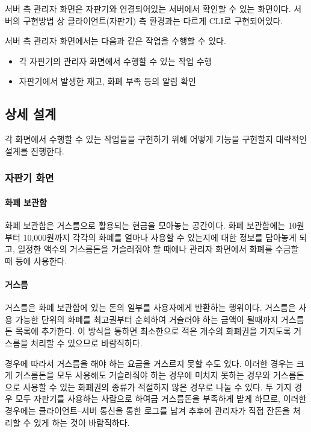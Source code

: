 \documentclass{oblivoir}
\begin{document}
    서버 측 관리자 화면은 자판기와 연결되어있는
    서버에서 확인할 수 있는 화면이다.
    서버의 구현방법 상 클라이언트(자판기) 측 환경과는 다르게
    CLI로 구현되어있다.

    서버 측 관리자 화면에서는 다음과 같은 작업을 수행할 수 있다.
    \begin{itemize}
        \item 각 자판기의 관리자 화면에서 수행할 수 있는 작업 수행
        \item 자판기에서 발생한 재고, 화폐 부족 등의 알림 확인
    \end{itemize}

    \subsection{상세 설계}

    각 화면에서 수행할 수 있는 작업들을 구현하기 위해
    어떻게 기능을 구현할지 대략적인 설계를 진행한다.

    \subsubsection{자판기 화면}

    \paragraph{화폐 보관함}

    화폐 보관함은 거스름으로 활용되는 현금을 모아놓는 공간이다.
    화폐 보관함에는 10원부터 10,000원까지 각각의 화폐를
    얼마나 사용할 수 있는지에 대한 정보를 담아놓게 되고,
    일정한 액수의 거스름돈을 거슬러줘야 할 때에나
    관리자 화면에서 화폐를 수금할 때 등에 사용한다.

    \paragraph{거스름}

    거스름은 화폐 보관함에 있는 돈의 일부를 사용자에게 반환하는 행위이다.
    거스름은 사용 가능한 단위의 화폐를 최고권부터 순회하여 거슬러야 하는
    금액이 될때까지 거스름돈 목록에 추가한다.
    이 방식을 통하면 최소한으로 적은 개수의 화폐권을 가지도록
    거스름을 처리할 수 있으므로 바람직하다.

    경우에 따라서 거스름을 해야 하는 요금을 거스르지 못할 수도 있다.
    이러한 경우는 크게 거스름돈을 모두 사용해도 거슬러줘야 하는 경우에
    미치지 못하는 경우와 거스름돈으로 사용할 수 있는 화폐권의 종류가
    적절하지 않은 경우로 나눌 수 있다.
    두 가지 경우 모두 자판기를 사용하는 사람으로 하여금 거스름돈을
    부족하게 받게 하므로,
    이러한 경우에는 클라이언트–서버 통신을 통한 로그를 남겨
    추후에 관리자가 직접 잔돈을 처리할 수 있게 하는 것이 바람직하다.
\end{document}
